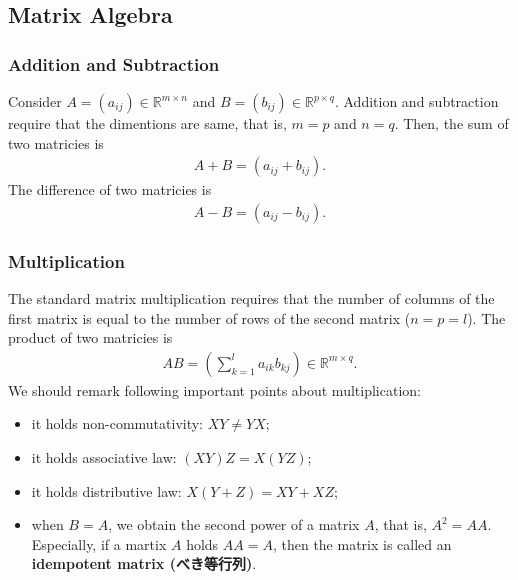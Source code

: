 \documentclass[
  12pt,
]{article}
\providecommand{\tightlist}{%
  \setlength{\itemsep}{0pt}\setlength{\parskip}{0pt}}
\begin{document}
\hypertarget{matrix-algebra}{%
\subsection{Matrix Algebra}\label{matrix-algebra}}

\hypertarget{addition-and-subtraction}{%
\subsubsection{Addition and Subtraction}\label{addition-and-subtraction}}

Consider \(A = (a_{ij}) \in \mathbb{R}^{m \times n}\) and \(B = (b_{ij}) \in \mathbb{R}^{p \times q}\).
Addition and subtraction require that the dimentions are same, that is, \(m = p\) and \(n = q\).
Then, the sum of two matricies is
\begin{align*}
  A + B = (a_{ij} + b_{ij}).
\end{align*}
The difference of two matricies is
\begin{align*}
  A - B = (a_{ij} - b_{ij}).
\end{align*}

\hypertarget{multiplication}{%
\subsubsection{Multiplication}\label{multiplication}}

The standard matrix multiplication requires that
the number of columns of the first matrix is equal to the number of rows of the second matrix (\(n = p = l\)).
The product of two matricies is
\begin{align*}
  AB = (\sum_{k=1}^l a_{ik} b_{kj}) \in \mathbb{R}^{m \times q}.
\end{align*}
We should remark following important points about multiplication:

\begin{itemize}
\tightlist
\item
  it holds non-commutativity: \(XY \not= YX\);
\item
  it holds associative law: \((XY)Z = X(YZ)\);
\item
  it holds distributive law: \(X(Y + Z) = XY + XZ\);
\item
  when \(B = A\), we obtain the second power of a matrix \(A\), that is, \(A^2 = A A\). Especially, if a martix \(A\) holds \(AA = A\), then the matrix is called an \textbf{idempotent matrix (べき等行列)}.
\end{itemize}
\end{document}
